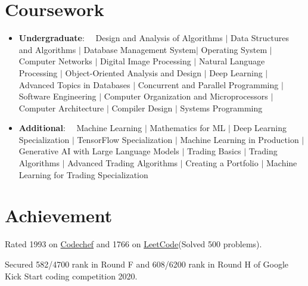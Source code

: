 \documentclass[a4paper,20pt]{article}
\newcommand{\resumeItem}[2]{
  \item\small{
    \textbf{#1}{: #2 \vspace{-2pt}}
  }
}
\newcommand{\resumeSubItem}[2]{\resumeItem{#1}{#2}\vspace{-3pt}}
\newcommand{\resumeSubHeadingListStart}{\begin{itemize}[leftmargin=*]}
\newcommand{\resumeSubHeadingListEnd}{\end{itemize}}
\begin{document}
\vspace{-3pt}
\section{Coursework}
	\resumeSubHeadingListStart
	\resumeSubItem{Undergraduate}{~~Design and Analysis of Algorithms $|$ Data Structures and Algorithms $|$ Database Management System$|$ Operating System $|$ Computer Networks $|$ Digital Image Processing $|$ Natural Language Processing $|$ Object-Oriented Analysis and Design $|$ Deep Learning $|$ Advanced Topics in Databases $|$ Concurrent and Parallel Programming $|$ Software Engineering $|$ Computer Organization and Microprocessors $|$ Computer Architecture $|$ Compiler Design $|$ Systems Programming}
	\resumeSubItem{Additional}{~~Machine Learning $|$ Mathematics for ML $|$ Deep Learning Specialization $|$ TensorFlow Specialization $|$ Machine Learning in Production $|$ Generative AI with Large Language Models $|$ Trading Basics $|$ Trading Algorithms $|$ Advanced Trading Algorithms $|$ Creating a Portfolio $|$ Machine Learning for Trading Specialization} 
	\resumeSubHeadingListEnd

\vspace{-3pt}
\section{Achievement}
\begin{description}[font=$\bullet$]
\item {Rated 1993 on \href{https://www.codechef.com/users/khimrajsuthar}{Codechef} and 1766 on \href{https://leetcode.com/khimrajsuthar/}{LeetCode}(Solved 500 problems).}
\vspace{-5pt}
\item {Secured 582/4700 rank in Round F and 608/6200 rank in Round H of Google Kick Start coding competition 2020.}

\end{description}
\end{document}
